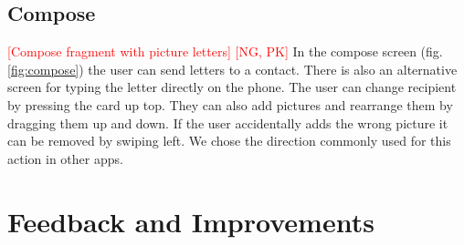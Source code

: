 \documentclass[acmlarge, review=false, screen=true]{acmart}
\begin{document}
    \subsection{Compose}
      \textcolor{red}{[Compose fragment with picture letters] [NG, PK]} \newline
      In the compose screen (fig. \ref{fig:compose}) the user can send letters to a contact. There is also an alternative screen for typing the letter directly on the phone. The user can change recipient by pressing the card up top. They can also add pictures and rearrange them by dragging them up and down. If the user accidentally adds the wrong picture it can be removed by swiping left. We chose the direction commonly used for this action in other apps.


  \section{Feedback and Improvements}
\end{document}
